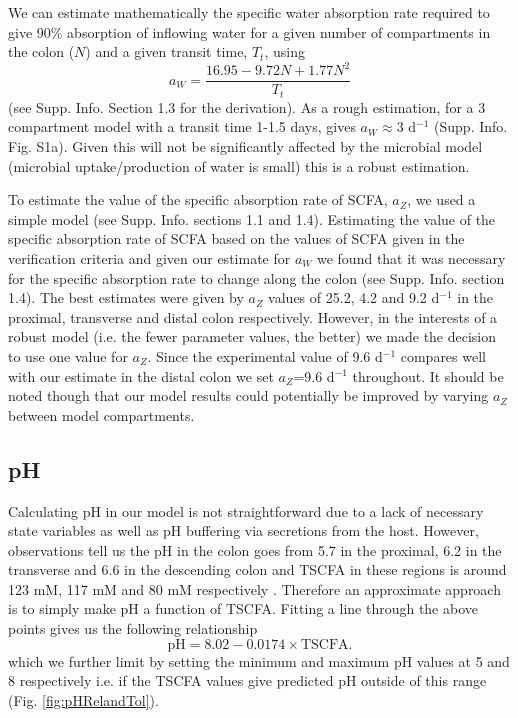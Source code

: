 \documentclass[a4paper]{article}
\begin{document}
We can estimate mathematically the specific water absorption rate required to give 90\% absorption of inflowing water for a given number of compartments in the colon ($N$) and a given transit time, $T_t$, using 
\begin{equation}
    a_W=\frac{16.95-9.72N+1.77N^2}{T_t}\label{eq:aW}
\end{equation}
(see Supp. Info. Section 1.3 for the derivation).
As a rough estimation, for a 3 compartment model with a transit time 1-1.5 days, gives $a_W\approx 3$  d$^{-1}$ (Supp. Info. Fig. S1a).
Given this will not be significantly affected by the microbial model (microbial uptake/production of water is small) this is a robust estimation.

To estimate the value of the specific absorption rate of SCFA, $a_Z$, we used a simple model (see Supp. Info. sections 1.1 and 1.4).
Estimating the value of the specific absorption rate of SCFA based on the values of SCFA given in the verification criteria and given our estimate for $a_W$ we found that it was necessary for the specific absorption rate to change along the colon (see Supp. Info. section 1.4). 
The best estimates were given by $a_Z$ values of 25.2, 4.2 and 9.2  d$^{-1}$ in the proximal, transverse and distal colon respectively. 
However, in the interests of a robust model (i.e. the fewer parameter values, the better) we made the decision to use one value for $a_Z$. Since the experimental value of 9.6  d$^{-1}$ compares well with our estimate in the distal colon we set $a_Z$=9.6  d$^{-1}$ throughout. It should be noted though that our model results could potentially be improved by varying $a_Z$ between model compartments.


\subsection*{pH}
Calculating pH in our model is not straightforward due to a lack of necessary state variables as well as pH buffering via secretions from the host. However, observations tell us the pH in the colon goes from 5.7 in the proximal, 6.2 in the transverse and 6.6 in the descending colon and TSCFA in these regions is around 123 mM, 117 mM and 80 mM respectively \citep{cummings}. Therefore an approximate approach is to simply make pH a function of TSCFA. 
Fitting a line through the above points gives us the following relationship
\begin{equation}
    \mbox{pH}=8.02-0.0174\times \mbox{TSCFA}.
\label{eq:pH(TSCFA)}
\end{equation}
which we further limit by setting the minimum and maximum pH values at 5 and 8 respectively i.e. if the TSCFA values give predicted pH outside of this range (Fig. \ref{fig:pHRelandTol}).
\end{document}
